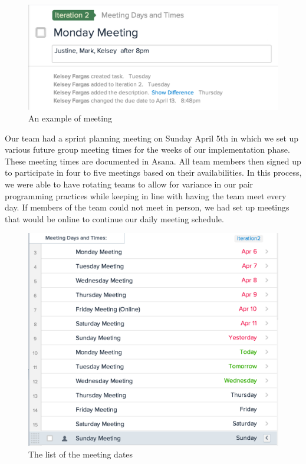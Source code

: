 \documentclass[]{article}
\begin{document}
\begin{figure}[htbp]
\centering
\includegraphics{images/meeting_example.png}
\caption{An example of meeting}
\end{figure}

Our team had a sprint planning meeting on Sunday April 5th in which we
set up various future group meeting times for the weeks of our
implementation phase. These meeting times are documented in Asana. All
team members then signed up to participate in four to five meetings
based on their availabilities. In this process, we were able to have
rotating teams to allow for variance in our pair programming practices
while keeping in line with having the team meet every day. If members of
the team could not meet in person, we had set up meetings that would be
online to continue our daily meeting schedule.


\begin{figure}[htbp]
\centering
\includegraphics{images/meeting_dates.png}
\caption{The list of the meeting dates}
\end{figure}
\end{document}
